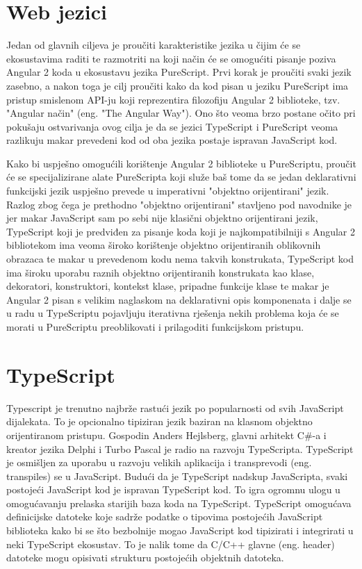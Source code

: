\documentclass[times, utf8, zavrsni]{fer}
\begin{document}
\section{Web jezici}
Jedan od glavnih ciljeva je proučiti karakteristike jezika u čijim će se ekosustavima raditi te razmotriti na koji način će se omogućiti pisanje poziva Angular 2 koda u ekosustavu jezika PureScript. Prvi korak je proučiti svaki jezik zasebno, a nakon toga je cilj proučiti kako da kod pisan u jeziku PureScript ima pristup smislenom API-ju koji reprezentira filozofiju Angular 2 biblioteke, tzv. "Angular način" (eng. "The Angular Way"). Ono što veoma brzo postane očito pri pokušaju ostvarivanja ovog cilja je da se jezici TypeScript i PureScript veoma razlikuju makar prevedeni kod od oba jezika postaje ispravan JavaScript kod. 

Kako bi uspješno omogućili korištenje Angular 2 biblioteke u PureScriptu, proučit će se specijalizirane alate PureScripta koji služe baš tome da se jedan deklarativni funkcijski jezik uspješno prevede u imperativni "objektno orijentirani" jezik. Razlog zbog čega je prethodno "objektno orijentirani" stavljeno pod navodnike je jer makar JavaScript sam po sebi nije klasični objektno orijentirani jezik, TypeScript koji je predviđen za pisanje koda koji je najkompatibilniji s Angular 2 bibliotekom ima veoma široko korištenje objektno orijentiranih oblikovnih obrazaca te makar u prevedenom kodu nema takvih konstrukata, TypeScript kod ima široku uporabu raznih objektno orijentiranih konstrukata kao klase, dekoratori, konstruktori, kontekst klase, pripadne funkcije klase te makar je Angular 2 pisan s velikim naglaskom na deklarativni opis komponenata i dalje se u radu u TypeScriptu pojavljuju iterativna rješenja nekih problema koja će se morati u PureScriptu preoblikovati i prilagoditi funkcijskom pristupu.

\section{TypeScript}
Typescript je trenutno najbrže rastući jezik po popularnosti od svih JavaScript dijalekata. To je opcionalno tipiziran jezik baziran na klasnom objektno orijentiranom pristupu. Gospodin Anders Hejlsberg, glavni arhitekt C\#-a i kreator jezika Delphi i Turbo Pascal je radio na razvoju TypeScripta. TypeScript je osmišljen za uporabu u razvoju velikih aplikacija i transprevodi (eng. transpiles) se u JavaScript. Budući da je TypeScript nadskup JavaScripta, svaki postojeći JavaScript kod je ispravan TypeScript kod. To igra ogromnu ulogu u omogućavanju prelaska starijih baza koda na TypeScript. TypeScript omogućava definicijske datoteke koje sadrže podatke o tipovima postojećih JavaScript biblioteka kako bi se što bezbolnije mogao JavaScript kod tipizirati i integrirati u neki TypeScript ekosustav. To je nalik tome da C/C++ glavne (eng. header) datoteke mogu opisivati strukturu postojećih objektnih datoteka.
\end{document}
